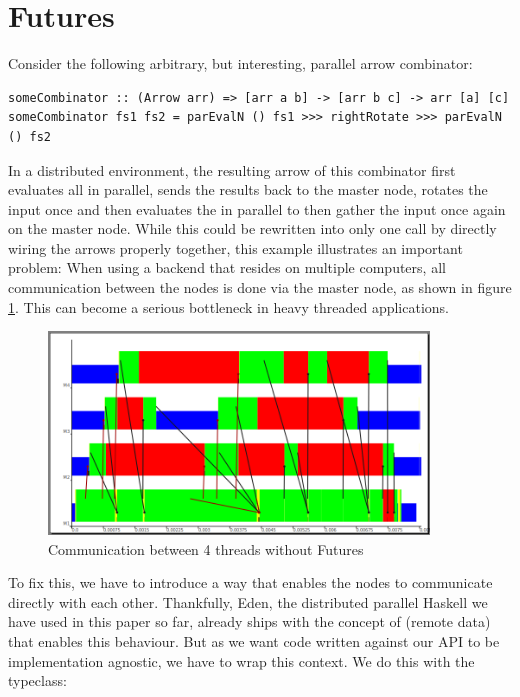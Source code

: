 \section{Futures} \label{futures}
Consider the following arbitrary, but interesting, parallel arrow combinator:
\begin{lstlisting}[frame=htrbl]
someCombinator :: (Arrow arr) => [arr a b] -> [arr b c] -> arr [a] [c]
someCombinator fs1 fs2 = parEvalN () fs1 >>> rightRotate >>> parEvalN () fs2
\end{lstlisting}
In a distributed environment, the resulting arrow of this combinator first evaluates all \code{[arr a b]} in parallel, sends the results back to the master node, rotates the input once and then evaluates the \code{[arr b c]} in parallel to then gather the input once again on the master node. While this could be rewritten into only one  call by directly wiring the arrows properly together, this example illustrates an important problem: When using a  backend that resides on multiple computers, all communication between the nodes is done via the master node, as shown in figure \ref{fig:withoutFutures}. This can become a serious bottleneck in heavy threaded applications.
\begin{figure}[ht]
	\centering
	\includegraphics[width=0.9\textwidth]{images/withoutFutures}
	\caption[without Futures]{Communication between 4 threads without Futures}
	\label{fig:withoutFutures}
\end{figure}
To fix this, we have to introduce a way that enables the nodes to communicate directly with each other. Thankfully, Eden, the distributed parallel Haskell we have used in this paper so far, already ships with the concept of  (remote data) that enables this behaviour. But as we want code written against our API to be implementation agnostic, we have to wrap this context. We do this with the  typeclass:
